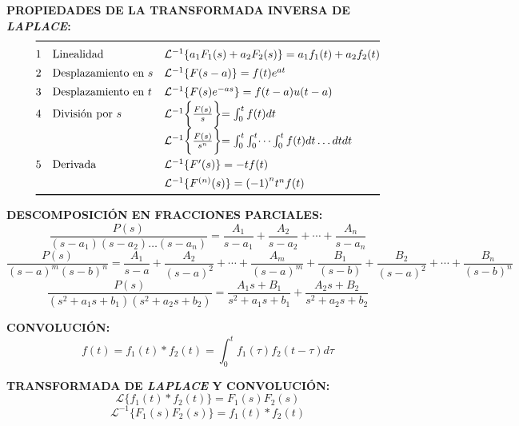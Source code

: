\documentclass[letter,twoside,8pt]{article}
\begin{document}
\textbf{PROPIEDADES DE LA TRANSFORMADA INVERSA DE \emph{LAPLACE}:}
\begin{equation*}
\def\arraystretch{1.4}
\begin{array}{@{}cll@{}}
\toprule
 1 & \text{Linealidad}
   & \mathcal{L}^{-1}\{a_1F_1(s)+a_2F_2(s)\}=a_1f_1(t)+a_2f_2(t)\\
 2 & \text{Desplazamiento en }s
   & \mathcal{L}^{-1}\{F(s-a)\}=f(t)e^{at}\\
 3 & \text{Desplazamiento en }t
   & \mathcal{L}^{-1}\{F(s)e^{-as}\}=f(t-a)u(t-a)\\
 4 & \text{División por }s
   & \mathcal{L}^{-1}\biggl\{\frac{F(s)}{s}\biggl\}=\int_0^{t}f(t){dt}\\
   &
   & \mathcal{L}^{-1}\biggl\{\frac{F(s)}{s^n}\biggl\}=\int_0^t\int_0^t\dots\int_0^{t}f(t){dt}\dots{dt}{dt}\\
 5 & \text{Derivada}
   & \mathcal{L}^{-1}\{F^{\prime}(s)\}={-t}f(t)\\
   &
   & \mathcal{L}^{-1}\{F^{(n)}(s)\}={(-1)}^{n}t^{n}f(t)\\
\bottomrule
\end{array}
\end{equation*}

\textbf{DESCOMPOSICIÓN EN FRACCIONES PARCIALES:}
\begin{equation*}
    \frac{P(s)}{(s-a_1)(s-a_2)\dots(s-a_n)}
        =\frac{A_1}{s-a_1}+\frac{A_2}{s-a_2}+\cdots+\frac{A_n}{s-a_n}
\end{equation*}
\begin{equation*}
    \frac{P(s)}{{(s-a)}^m{(s-b)}^n}
        =\frac{A_1}{s-a}+\frac{A_2}{{(s-a)}^2}+\cdots+\frac{A_m}{{(s-a)}^m}
        +\frac{B_1}{(s-b)}+\frac{B_2}{{(s-a)}^2}+\cdots+\frac{B_n}{{(s-b)}^n}
\end{equation*}
\begin{equation*}
    \frac{P(s)}{(s^2+{a_1}s+b_1)(s^2+{a_2}s+b_2)}
        =\frac{{A_1}s+B_1}{s^2+{a_1}s+b_1}
        +\frac{{A_2}s+B_2}{s^2+{a_2}s+b_2}
\end{equation*}

\textbf{CONVOLUCIÓN:}
\begin{equation*}
    f(t)=f_1(t)*f_2(t)=\int_{0}^{t}f_1(\tau)f_2(t-\tau){d\tau}
\end{equation*}

\textbf{TRANSFORMADA DE \emph{LAPLACE} Y CONVOLUCIÓN:}
\begin{equation*}
    \mathcal{L}\{f_1(t)*f_2(t)\}=F_1(s)F_2(s)
\end{equation*}
\begin{equation*}
    \mathcal{L}^{-1}\{F_1(s)F_2(s)\}=f_1(t)*f_2(t)
\end{equation*}
\end{document}
